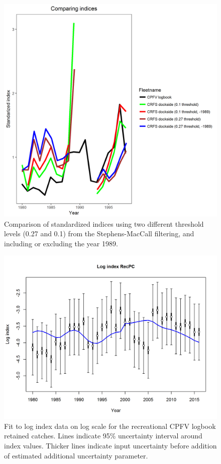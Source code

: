 \documentclass[12pt,]{article}
\begin{document}
\FloatBarrier

\begin{figure}[htbp]
\centering
\includegraphics{Figures/Fleet5_RecPC_dockside_index_compare.png}
\caption{Comparison of standardized indices using two different
threshold levels (0.27 and 0.1) from the Stephens-MacCall filtering, and
including or excluding the year 1989.
\label{fig:Fleet5_RecPC_dockside_index_compare}}
\end{figure}

\FloatBarrier

\begin{figure}[htbp]
\centering
\includegraphics{r4ss/plots_mod1/index5_logcpuefit_RecPC.png}
\caption{Fit to log index data on log scale for the recreational CPFV
logbook retained catches. Lines indicate 95\% uncertainty interval
around index values. Thicker lines indicate input uncertainty before
addition of estimated additional uncertainty parameter.
\label{fig:index5_logcpuefit_RecPC}}
\end{figure}
\end{document}
